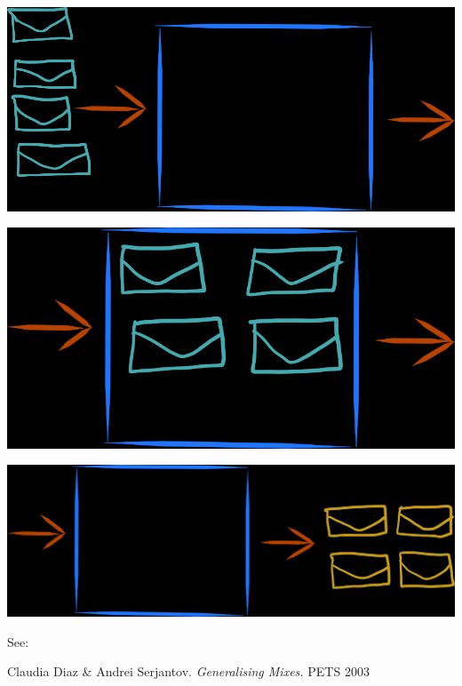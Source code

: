 \documentclass[fleqn,xcolor={usenames,dvipsnames}]{beamer} %
\begin{document}
\begin{frame}
\begin{center}
\includegraphics[scale=.20]{pics/mix1}
\end{center}
\end{frame}

\begin{frame}
\begin{center}
\includegraphics[scale=.20]{pics/mix2}
\end{center}
\end{frame}

\begin{frame}
\begin{center}
\includegraphics[scale=.20]{pics/mix3}
\end{center}
\end{frame}

\begin{frame}
\bigskip

See: \\ \smallskip

\hspace*{3pt} Claudia Diaz \& Andrei Serjantov.  {\em Generalising Mixes.}  PETS 2003
\end{frame}
\end{document}
